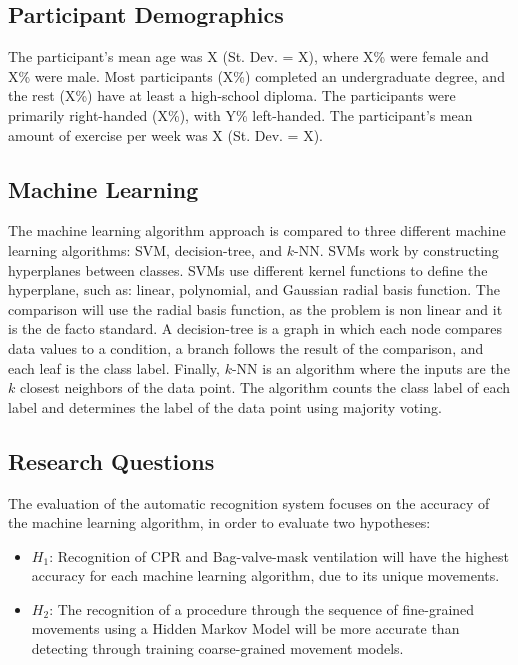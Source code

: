 \subsection{Participant Demographics}
\label{sec:Data-Collection:Participant-Demographics}
The participant’s mean age was X (St. Dev. = X), where X\% were female and X\% were male. Most participants (X\%) completed an undergraduate degree, and the rest (X\%) have at least a high-school diploma. The participants were primarily right-handed (X\%), with Y\% left-handed. The participant's mean amount of exercise per week was X (St. Dev. = X).

\subsection{Machine Learning}
\label{sec:Data-Collection:Machine-Learning}
 The machine learning algorithm approach is compared to three different machine learning algorithms: SVM, decision-tree, and $k$-NN. SVMs work by constructing hyperplanes between classes. SVMs use different kernel functions to define the hyperplane, such as: linear, polynomial, and Gaussian radial basis function. The comparison will use the radial basis function, as the problem is non linear and it is the de facto standard. A decision-tree is a graph in which each node compares data values to a condition, a branch follows the result of the comparison, and each leaf is the class label. Finally, $k$-NN is an algorithm where the inputs are the $k$ closest neighbors of the data point. The algorithm counts the class label of each label and determines the label of the data point using majority voting. 
 
 \subsection{Research Questions}
 \label{sec:Data-Collection:Research-Questions}
 The evaluation of the automatic recognition system focuses on the accuracy of the machine learning algorithm, in order to evaluate two hypotheses:
 \begin{itemize}
 	\item $H_1$: Recognition of CPR and Bag-valve-mask ventilation will have the highest accuracy for each machine learning algorithm, due to its unique movements.
 	\item $H_2$: The recognition of a procedure through the sequence of fine-grained movements using a Hidden Markov Model will be more accurate than detecting through training coarse-grained movement models.
 \end{itemize}